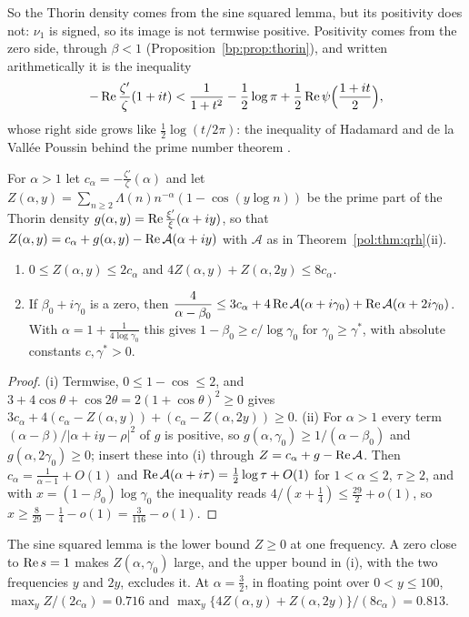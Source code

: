 So the Thorin density comes from the sine squared lemma, but its positivity does not: $\nu_1$ is signed, so its image is not termwise positive. Positivity comes from the zero side, through $\beta<1$ (Proposition~\ref{bp:prop:thorin}), and written arithmetically it is the inequality
\[
-\operatorname{Re}\frac{\zeta'}{\zeta}(1+it)<\frac1{1+t^2}-\frac12\log\pi+\frac12\operatorname{Re}\psi\Big(\frac{1+it}2\Big),
\]
whose right side grows like $\frac12\log(t/2\pi)$: the inequality of Hadamard and de la Vall\'ee Poussin behind the prime number theorem \cite{Titchmarsh}.

\begin{proposition}\label{tx3:prop:dvp}
For $\alpha>1$ let $c_\alpha=-\frac{\zeta'}{\zeta}(\alpha)$ and let $Z(\alpha,y)=\sum_{n\ge2}\Lambda(n)n^{-\alpha}(1-\cos(y\log n))$ be the prime part of the Thorin density $g(\alpha,y)=\operatorname{Re}\frac{\xi'}{\xi}(\alpha+iy)$, so that $Z(\alpha,y)=c_\alpha+g(\alpha,y)-\operatorname{Re}\mathcal A(\alpha+iy)$ with $\mathcal A$ as in Theorem~\ref{pol:thm:qrh}(ii).
\begin{enumerate}
\item[(i)] $0\le Z(\alpha,y)\le2c_\alpha$ and $4Z(\alpha,y)+Z(\alpha,2y)\le8c_\alpha$.
\item[(ii)] If $\beta_0+i\gamma_0$ is a zero, then $\dfrac4{\alpha-\beta_0}\le3c_\alpha+4\operatorname{Re}\mathcal A(\alpha+i\gamma_0)+\operatorname{Re}\mathcal A(\alpha+2i\gamma_0)$. With $\alpha=1+\frac1{4\log\gamma_0}$ this gives $1-\beta_0\ge c/\log\gamma_0$ for $\gamma_0\ge\gamma^*$, with absolute constants $c,\gamma^*>0$.
\end{enumerate}
\end{proposition}

\begin{proof}
(i) Termwise, $0\le1-\cos\le2$, and $3+4\cos\theta+\cos2\theta=2(1+\cos\theta)^2\ge0$ gives $3c_\alpha+4(c_\alpha-Z(\alpha,y))+(c_\alpha-Z(\alpha,2y))\ge0$. (ii) For $\alpha>1$ every term $(\alpha-\beta)/|\alpha+iy-\rho|^2$ of $g$ is positive, so $g(\alpha,\gamma_0)\ge1/(\alpha-\beta_0)$ and $g(\alpha,2\gamma_0)\ge0$; insert these into (i) through $Z=c_\alpha+g-\operatorname{Re}\mathcal A$. Then $c_\alpha=\frac1{\alpha-1}+O(1)$ and $\operatorname{Re}\mathcal A(\alpha+i\tau)=\frac12\log\tau+O(1)$ for $1<\alpha\le2$, $\tau\ge2$, and with $x=(1-\beta_0)\log\gamma_0$ the inequality reads $4/(x+\frac14)\le\frac{29}2+o(1)$, so $x\ge\frac{8}{29}-\frac14-o(1)=\frac3{116}-o(1)$.
\end{proof}

The sine squared lemma is the lower bound $Z\ge0$ at one frequency. A zero close to $\operatorname{Re} s=1$ makes $Z(\alpha,\gamma_0)$ large, and the upper bound in (i), with the two frequencies $y$ and $2y$, excludes it. At $\alpha=\frac32$, in floating point over $0<y\le100$, $\max_yZ/(2c_\alpha)=0.716$ and $\max_y\{4Z(\alpha,y)+Z(\alpha,2y)\}/(8c_\alpha)=0.813$.

